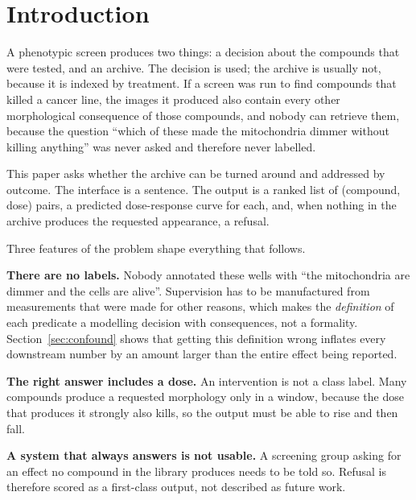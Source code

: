 \documentclass[11pt]{article}
\begin{document}
\section{Introduction}

A phenotypic screen produces two things: a decision about the compounds that were
tested, and an archive. The decision is used; the archive is usually not, because it
is indexed by treatment. If a screen was run to find compounds that killed a cancer
line, the images it produced also contain every other morphological consequence of
those compounds, and nobody can retrieve them, because the question ``which of these
made the mitochondria dimmer without killing anything'' was never asked and therefore
never labelled.

This paper asks whether the archive can be turned around and addressed by outcome. The
interface is a sentence. The output is a ranked list of (compound, dose) pairs, a
predicted dose-response curve for each, and, when nothing in the archive produces the
requested appearance, a refusal.

Three features of the problem shape everything that follows.

\textbf{There are no labels.} Nobody annotated these wells with ``the mitochondria are
dimmer and the cells are alive''. Supervision has to be manufactured from measurements
that were made for other reasons, which makes the \emph{definition} of each predicate a
modelling decision with consequences, not a formality. Section~\ref{sec:confound} shows
that getting this definition wrong inflates every downstream number by an amount larger
than the entire effect being reported.

\textbf{The right answer includes a dose.} An intervention is not a class label. Many
compounds produce a requested morphology only in a window, because the dose that
produces it strongly also kills, so the output must be able to rise and then fall.

\textbf{A system that always answers is not usable.} A screening group asking for an
effect no compound in the library produces needs to be told so. Refusal is therefore
scored as a first-class output, not described as future work.
\end{document}
